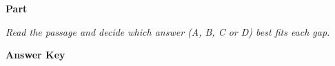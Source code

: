 \documentclass[../Exercise.tex]{subfiles}
\begin{document}
\begin{center}
	\large{\textbf{Part }}
\end{center} 

\vspace{5ex}

\noindent \textit{Read the passage and decide which answer (A, B, C or D) best fits each gap.}




\begin{mdframed}
\textbf{Answer Key}


\end{mdframed}

\vspace{7ex}
\end{document}
